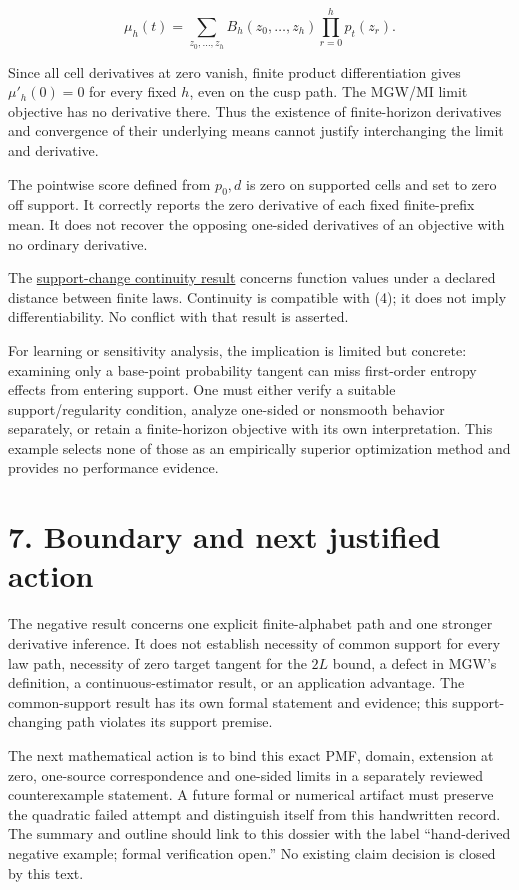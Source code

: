 \documentclass[11pt,a4paper]{article}
\newcounter{none}
\begin{document}
\[
\mu_h(t)=
\sum_{z_0,\ldots,z_h}
B_h(z_0,\ldots,z_h)\prod_{r=0}^h p_t(z_r).
\]

Since all cell derivatives at zero vanish, finite product differentiation gives \(\mu'_h(0)=0\) for every fixed \(h\), even on the cusp path. The MGW/MI limit objective has no derivative there. Thus the existence of finite-horizon derivatives and convergence of their underlying means cannot justify interchanging the limit and derivative.

The pointwise score defined from \(p_0,d\) is zero on supported cells and set to zero off support. It correctly reports the zero derivative of each fixed finite-prefix mean. It does not recover the opposing one-sided derivatives of an objective with no ordinary derivative.

The \href{https://github.com/sepahead/pid-rs/blob/main/SUPPORT_CHANGE_TOLERANT_AVERAGED_SXPID_CONTINUITY.md}{support-change continuity result} concerns function values under a declared distance between finite laws. Continuity is compatible with (4); it does not imply differentiability. No conflict with that result is asserted.

For learning or sensitivity analysis, the implication is limited but concrete: examining only a base-point probability tangent can miss first-order entropy effects from entering support. One must either verify a suitable support/regularity condition, analyze one-sided or nonsmooth behavior separately, or retain a finite-horizon objective with its own interpretation. This example selects none of those as an empirically superior optimization method and provides no performance evidence.

\section{7. Boundary and next justified action}\label{boundary-and-next-justified-action}

The negative result concerns one explicit finite-alphabet path and one stronger derivative inference. It does not establish necessity of common support for every law path, necessity of zero target tangent for the \(2L\) bound, a defect in MGW's definition, a continuous-estimator result, or an application advantage. The common-support result has its own formal statement and evidence; this support-changing path violates its support premise.

The next mathematical action is to bind this exact PMF, domain, extension at zero, one-source correspondence and one-sided limits in a separately reviewed counterexample statement. A future formal or numerical artifact must preserve the quadratic failed attempt and distinguish itself from this handwritten record. The summary and outline should link to this dossier with the label ``hand-derived negative example; formal verification open.'' No existing claim decision is closed by this text.
\end{document}
